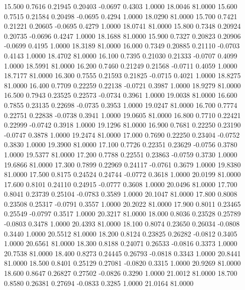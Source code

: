   15.500   0.7616   0.21945   0.20403  -0.0697   0.4303   1.0000  18.0046  81.0000
  15.600   0.7515   0.21584   0.20498  -0.0695   0.4294   1.0000  18.0290  81.0000
  15.700   0.7421   0.21221   0.20605  -0.0695   0.4279   1.0000  18.0741  81.0000
  15.800   0.7348   0.20924   0.20735  -0.0696   0.4247   1.0000  18.1688  81.0000
  15.900   0.7327   0.20823   0.20906  -0.0699   0.4195   1.0000  18.3189  81.0000
  16.000   0.7349   0.20885   0.21110  -0.0703   0.4143   1.0000  18.4702  81.0000
  16.100   0.7395   0.21030   0.21333  -0.0707   0.4099   1.0000  18.5991  81.0000
  16.200   0.7460   0.21249   0.21568  -0.0711   0.4059   1.0000  18.7177  81.0000
  16.300   0.7555   0.21593   0.21825  -0.0715   0.4021   1.0000  18.8275  81.0000
  16.400   0.7709   0.22259   0.22138  -0.0721   0.3987   1.0000  18.9279  81.0000
  16.500   0.7943   0.23525   0.22573  -0.0734   0.3961   1.0000  19.0038  81.0000
  16.600   0.7855   0.23135   0.22698  -0.0735   0.3953   1.0000  19.0247  81.0000
  16.700   0.7774   0.22751   0.22838  -0.0738   0.3941   1.0000  19.0605  81.0000
  16.800   0.7710   0.22421   0.22999  -0.0742   0.3918   1.0000  19.1296  81.0000
  16.900   0.7681   0.22250   0.23190  -0.0747   0.3878   1.0000  19.2474  81.0000
  17.000   0.7690   0.22250   0.23404  -0.0752   0.3830   1.0000  19.3900  81.0000
  17.100   0.7726   0.22351   0.23629  -0.0756   0.3780   1.0000  19.5377  81.0000
  17.200   0.7788   0.22551   0.23863  -0.0759   0.3730   1.0000  19.6866  81.0000
  17.300   0.7899   0.22969   0.24117  -0.0761   0.3679   1.0000  19.8380  81.0000
  17.500   0.8175   0.24524   0.24744  -0.0772   0.3618   1.0000  20.0199  81.0000
  17.600   0.8101   0.24110   0.24915  -0.0777   0.3608   1.0000  20.0496  81.0000
  17.700   0.8041   0.23739   0.25104  -0.0783   0.3589   1.0000  20.1047  81.0000
  17.800   0.8008   0.23508   0.25317  -0.0791   0.3557   1.0000  20.2022  81.0000
  17.900   0.8011   0.23465   0.25549  -0.0797   0.3517   1.0000  20.3217  81.0000
  18.000   0.8036   0.23528   0.25789  -0.0803   0.3478   1.0000  20.4393  81.0000
  18.100   0.8074   0.23650   0.26034  -0.0808   0.3440   1.0000  20.5512  81.0000
  18.200   0.8124   0.23825   0.26282  -0.0812   0.3405   1.0000  20.6561  81.0000
  18.300   0.8188   0.24071   0.26533  -0.0816   0.3373   1.0000  20.7538  81.0000
  18.400   0.8273   0.24445   0.26793  -0.0818   0.3343   1.0000  20.8441  81.0000
  18.500   0.8401   0.25129   0.27081  -0.0820   0.3315   1.0000  20.9269  81.0000
  18.600   0.8647   0.26827   0.27502  -0.0826   0.3290   1.0000  21.0012  81.0000
  18.700   0.8580   0.26381   0.27694  -0.0833   0.3285   1.0000  21.0164  81.0000
